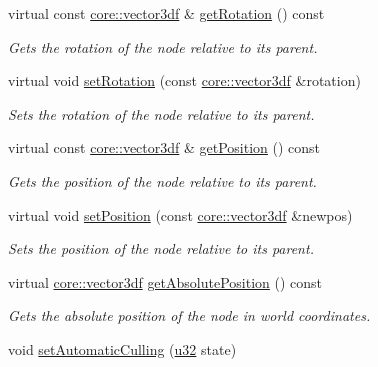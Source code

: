 \begin{DoxyCompactItemize}
virtual const \hyperlink{namespaceirr_1_1core_ae6e2b2a6c552833ebbd5b7463d03586b}{core\+::vector3df} \& \hyperlink{classirr_1_1scene_1_1ISceneNode_acfef9f174e2398b479915791e4084061}{get\+Rotation} () const
\begin{DoxyCompactList}\small\item\em Gets the rotation of the node relative to its parent. \end{DoxyCompactList}\item 
virtual void \hyperlink{classirr_1_1scene_1_1ISceneNode_adb6ff54f52d3a9e1514cd487a550935c}{set\+Rotation} (const \hyperlink{namespaceirr_1_1core_ae6e2b2a6c552833ebbd5b7463d03586b}{core\+::vector3df} \&rotation)
\begin{DoxyCompactList}\small\item\em Sets the rotation of the node relative to its parent. \end{DoxyCompactList}\item 
virtual const \hyperlink{namespaceirr_1_1core_ae6e2b2a6c552833ebbd5b7463d03586b}{core\+::vector3df} \& \hyperlink{classirr_1_1scene_1_1ISceneNode_af5686d35e868e7d295c2d2cb84799d20}{get\+Position} () const
\begin{DoxyCompactList}\small\item\em Gets the position of the node relative to its parent. \end{DoxyCompactList}\item 
virtual void \hyperlink{classirr_1_1scene_1_1ISceneNode_a2166eb0a92cc0e46c49266f41a68ed50}{set\+Position} (const \hyperlink{namespaceirr_1_1core_ae6e2b2a6c552833ebbd5b7463d03586b}{core\+::vector3df} \&newpos)
\begin{DoxyCompactList}\small\item\em Sets the position of the node relative to its parent. \end{DoxyCompactList}\item 
virtual \hyperlink{namespaceirr_1_1core_ae6e2b2a6c552833ebbd5b7463d03586b}{core\+::vector3df} \hyperlink{classirr_1_1scene_1_1ISceneNode_a09a1c2ce3cf5448197a0c7b0bb16a516}{get\+Absolute\+Position} () const
\begin{DoxyCompactList}\small\item\em Gets the absolute position of the node in world coordinates. \end{DoxyCompactList}\item 
void \hyperlink{classirr_1_1scene_1_1ISceneNode_a5fcd62dbf524b8d2d6daa61c7d6cf119}{set\+Automatic\+Culling} (\hyperlink{namespaceirr_a0416a53257075833e7002efd0a18e804}{u32} state)

\end{DoxyCompactItemize}

